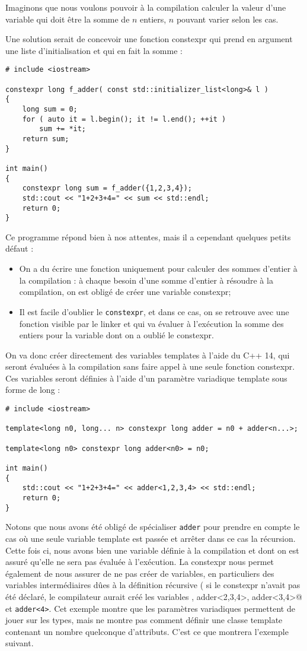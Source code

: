 \documentclass[a4]{article}
\begin{document}
Imaginons que nous voulons pouvoir à la compilation calculer la valeur d'une variable qui doit être la somme de $n$ entiers, $n$ pouvant varier
selon les cas.

Une solution serait de concevoir une fonction constexpr qui prend en argument une liste d'initialisation et qui en fait la somme :

\begin{lstlisting}
# include <iostream>

constexpr long f_adder( const std::initializer_list<long>& l )
{
    long sum = 0;
    for ( auto it = l.begin(); it != l.end(); ++it )
        sum += *it;
    return sum;
}

int main()
{
    constexpr long sum = f_adder({1,2,3,4});
    std::cout << "1+2+3+4=" << sum << std::endl;
    return 0;
}
\end{lstlisting}

Ce programme répond bien à nos attentes, mais il a cependant quelques petits défaut :
\begin{itemize}
\item On a du écrire une fonction uniquement pour calculer des sommes d'entier à la compilation : à chaque besoin d'une somme d'entier
à résoudre à la compilation, on est obligé de créer une variable constexpr;
\item Il est facile d'oublier le \verb$constexpr$, et dans ce cas, on se retrouve avec une fonction visible par le linker et qui va évaluer
à l'exécution la somme des entiers pour la variable dont on a oublié le constexpr.
\end{itemize}

On va donc créer directement des variables templates à l'aide du C++ 14, qui seront évaluées à la compilation sans faire appel à une seule
fonction constexpr. Ces variables seront définies à l'aide d'un paramètre variadique template sous forme de long :

\begin{lstlisting}
# include <iostream>

template<long n0, long... n> constexpr long adder = n0 + adder<n...>;

template<long n0> constexpr long adder<n0> = n0;

int main()
{
    std::cout << "1+2+3+4=" << adder<1,2,3,4> << std::endl;
    return 0;
}
\end{lstlisting}

Notons que nous avons été obligé de spécialiser \verb$adder$ pour prendre en compte le cas où une seule variable template est passée
et arrêter dans ce cas la récursion. Cette fois ci, nous avons bien une variable définie à la compilation et dont on est assuré qu'elle
ne sera pas évaluée à l'exécution. La constexpr nous permet également de nous assurer de ne pas créer de variables, en particuliers des
variables intermédiaires dûes à la définition récursive ( si le constexpr n'avait pas été déclaré, le compilateur aurait créé
les variables , adder<2,3,4>, adder<3,4>@ et \verb$adder<4>$.
Cet exemple montre que les paramètres variadiques permettent de jouer sur les types, 
mais ne montre pas comment définir une classe template contenant un nombre quelconque
d'attributs. C'est ce que montrera l'exemple suivant.
\end{document}
